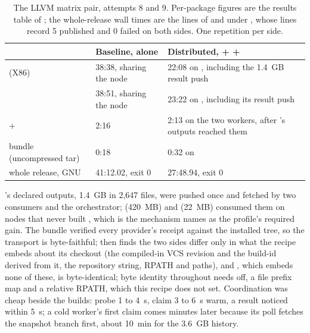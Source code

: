 \begin{table}[ht]
\centering\footnotesize
\caption{The LLVM matrix pair, attempts 8 and 9. Per-package figures are the
results table of \protect{}; the whole-release
wall times are the  lines of
\protect{} and \protect{}
under \protect{},
whose  lines record 5 published and 0 failed on both sides. One
repetition per side.}
\label{tab:eval:llvm-matrix}
\begin{tabular}{@{}L{4.6cm}L{3.6cm}L{5cm}@{}}
\toprule
& Baseline,  alone & Distributed,  +  +
 \\
\midrule
{} (X86) & 38:38, sharing the node & 22:08 on , including
the 1.4~GB result push \\
 & 38:51, sharing the node & 23:22 on , including
its result push \\
 +  & 2:16 & 2:13 on the two workers, after 's
outputs reached them \\
bundle (uncompressed tar) & 0:18 & 0:32 on  \\
whole release, GNU  & 41:12.02, exit 0 & 27:48.94, exit 0 \\
\bottomrule
\end{tabular}
\end{table}

's declared outputs, 1.4~GB in 2,647 files, were pushed once and
fetched by two consumers and the orchestrator;  (420~MB) and
 (22~MB) consumed them on nodes that never built ,
which is the mechanism  names as the profile's required gain. The
bundle verified every provider's receipt against the installed tree, so the
transport is byte-faithful;  then finds the two sides differ
only in what the recipe embeds about its checkout (the compiled-in VCS
revision and the build-id derived from it, the repository string, RPATH and
 paths), and , which embeds none of
these, is byte-identical; byte identity throughout needs
 off, a file prefix map and a relative RPATH,
which this recipe does not set. Coordination was cheap beside the builds: probe
1 to 4~s, claim 3 to 6~s warm, a result noticed within 5~s; a cold worker's
first claim comes minutes later because its poll fetches the snapshot branch
first, about 10~min for the 3.6~GB history.

